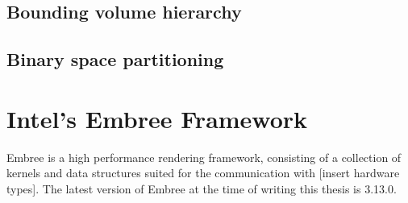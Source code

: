 \subsection{Bounding volume hierarchy}

\subsection{Binary space partitioning}


\section{Intel\textregistered's Embree Framework}
Embree is a high performance rendering framework, consisting of a collection of kernels and data structures suited for the communication with [insert hardware types]. The latest version of Embree at the time of writing this thesis is 3.13.0.